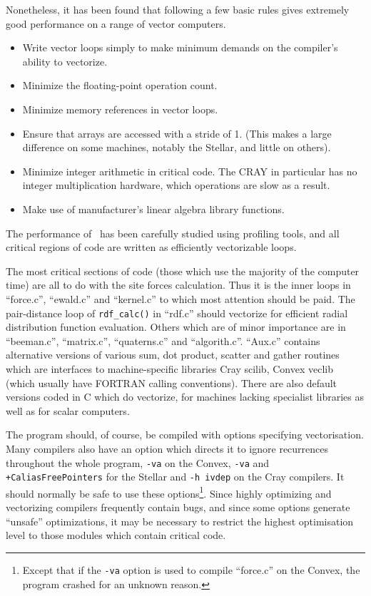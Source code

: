 Nonetheless, it has been found that following a few basic rules gives
extremely good performance on a range of vector computers.
\begin{itemize}
\item Write vector loops simply to make minimum demands on the
compiler's ability to vectorize.
\item Minimize the floating-point operation count.
\item Minimize memory references in vector loops.
\item Ensure that arrays are accessed with a stride of 1.  (This makes
a large difference on some machines, notably the Stellar, and little
on others). 
\item Minimize integer arithmetic in critical code.  The CRAY in
particular has no  integer multiplication hardware, which operations
are slow as a result.
\item Make use of manufacturer's linear algebra library functions.
\end{itemize}
The performance of \moldy\  has been carefully studied using profiling
tools, and all critical regions of code are written as efficiently
vectorizable loops.  

The most critical sections of code (\ie those which use the majority
of the computer time) are all to do with the site forces calculation.
Thus it is the inner loops in ``force.c'', ``ewald.c'' and
``kernel.c'' to which most attention should be paid.  The
pair-distance loop of \verb'rdf_calc()' in ``rdf.c'' should vectorize
for efficient radial distribution function evaluation. Others which
are of minor importance are in ``beeman.c'', ``matrix.c'',
``quaterns.c'' and ``algorith.c''.  ``Aux.c'' contains alternative
versions of various sum, dot product, scatter and gather routines
\etc which are interfaces to machine-specific libraries \eg
Cray scilib, Convex veclib (which usually have FORTRAN calling
conventions). There are also default versions coded in C which do
vectorize, for machines lacking specialist libraries as well as for
scalar computers.

The program should, of course, be compiled with options specifying
vectorisation. Many compilers also have an option which directs it to
ignore recurrences throughout the whole program, \eg \verb'-va' on the
Convex, \verb'-va' and \verb'+CaliasFreePointers' for the Stellar and
\verb'-h ivdep' on the Cray compilers. It should  normally be safe to
use these options\footnote{Except that if the  \verb'-va' option is
used to compile ``force.c'' on the Convex, the program crashed for an
unknown reason.}.  Since highly optimizing and vectorizing compilers
frequently contain bugs, and since some options generate ``unsafe''
optimizations,  it may be necessary to restrict the highest
optimisation level to those modules which contain critical code.

